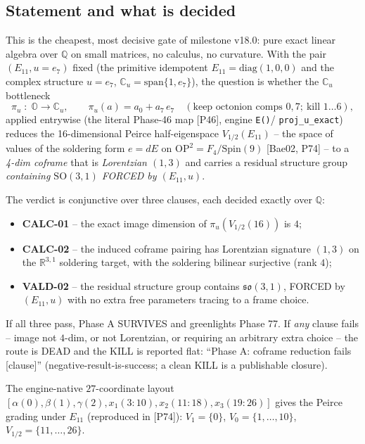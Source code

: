 \subsection{Statement and what is decided}

This is the cheapest, most decisive gate of milestone v18.0: pure exact linear
algebra over $\mathbb{Q}$ on small matrices, no calculus, no curvature. With the
pair $(E_{11}, u=e_7)$ fixed (the primitive idempotent $E_{11}=\mathrm{diag}(1,0,0)$
and the complex structure $u=e_7$, $\mathbb{C}_u=\mathrm{span}\{1,e_7\}$), the
question is whether the $\mathbb{C}_u$ bottleneck
\[
  \pi_u \;:\; \mathbb{O} \longrightarrow \mathbb{C}_u, \qquad
  \pi_u(a) = a_0 + a_7\, e_7 \quad (\text{keep octonion comps }0,7;\ \text{kill }1\ldots 6),
\]
applied entrywise (the literal Phase-46 map [P46], engine \texttt{E()}/
\texttt{proj\_u\_exact}) reduces the 16-dimensional Peirce half-eigenspace
$V_{1/2}(E_{11})$ -- the space of values of the soldering form $e=dE$ on
$\mathrm{OP}^2=F_4/\mathrm{Spin}(9)$ [Bae02, P74] -- to a \emph{4-dim coframe}
that is \emph{Lorentzian $(1,3)$} and carries a residual structure group
\emph{containing $\mathrm{SO}(3,1)$ FORCED by $(E_{11},u)$}.

The verdict is conjunctive over three clauses, each decided exactly over $\mathbb{Q}$:
\begin{itemize}
  \item[(a)] \textbf{CALC-01} -- the exact image dimension of $\pi_u(V_{1/2}(16))$ is $4$;
  \item[(b)] \textbf{CALC-02} -- the induced coframe pairing has Lorentzian signature
        $(1,3)$ on the $\mathbb{R}^{3,1}$ soldering target, with the soldering bilinear
        surjective (rank $4$);
  \item[(c)] \textbf{VALD-02} -- the residual structure group contains $\mathfrak{so}(3,1)$,
        FORCED by $(E_{11},u)$ with no extra free parameters tracing to a frame choice.
\end{itemize}
If all three pass, Phase A SURVIVES and greenlights Phase 77. If \emph{any} clause
fails -- image not $4$-dim, or not Lorentzian, or requiring an arbitrary extra choice --
the route is DEAD and the KILL is reported flat: ``Phase A: coframe reduction fails
[clause]'' (negative-result-is-success; a clean KILL is a publishable closure).

The engine-native $27$-coordinate layout
$[\alpha(0),\beta(1),\gamma(2),x_1(3\!:\!10),x_2(11\!:\!18),x_3(19\!:\!26)]$ gives the
Peirce grading under $E_{11}$ (reproduced in [P74]): $V_1=\{0\}$, $V_0=\{1,\ldots,10\}$,
$V_{1/2}=\{11,\ldots,26\}$.

